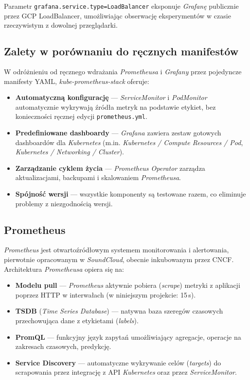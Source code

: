 Parametr \texttt{grafana.service.type=LoadBalancer} eksponuje \textit{Grafanę} publicznie przez GCP LoadBalancer, umożliwiając obserwację eksperymentów w czasie rzeczywistym z dowolnej przeglądarki.

\subsection{Zalety w porównaniu do ręcznych manifestów}

W odróżnieniu od ręcznego wdrażania \textit{Prometheusa} i \textit{Grafany} przez pojedyncze manifesty YAML, \textit{kube-prometheus-stack} oferuje:

\begin{itemize}
  \item \textbf{Automatyczną konfigurację} — \textit{ServiceMonitor} i \textit{PodMonitor} automatycznie wykrywają źródła metryk na podstawie etykiet, bez konieczności ręcznej edycji \texttt{prometheus.yml}.
  \item \textbf{Predefiniowane dashboardy} — \textit{Grafana} zawiera zestaw gotowych dashboardów dla \textit{Kubernetes} (m.in. \textit{Kubernetes / Compute Resources / Pod}, \textit{Kubernetes / Networking / Cluster}).
  \item \textbf{Zarządzanie cyklem życia} — \textit{Prometheus Operator} zarządza aktualizacjami, backupami i skalowaniem \textit{Prometheusa}.
  \item \textbf{Spójność wersji} — wszystkie komponenty są testowane razem, co eliminuje problemy z niezgodnością wersji.
\end{itemize}

\subsection{Prometheus}

\textit{Prometheus} jest otwartoźródłowym systemem monitorowania i alertowania, pierwotnie opracowanym w \textit{SoundCloud}, obecnie inkubowanym przez CNCF. Architektura \textit{Prometheusa} opiera się na:

\begin{itemize}
  \item \textbf{Modelu pull} — \textit{Prometheus} aktywnie pobiera (\textit{scrape}) metryki z aplikacji poprzez HTTP w interwałach (w niniejszym projekcie: 15\,s).
  \item \textbf{TSDB} (\textit{Time Series Database}) — natywna baza szeregów czasowych przechowująca dane z etykietami (\textit{labels}).
  \item \textbf{PromQL} — funkcyjny język zapytań umożliwiający agregacje, operacje na zakresach czasowych, predykcję.
  \item \textbf{Service Discovery} — automatyczne wykrywanie celów (\textit{targets}) do scrapowania przez integrację z API \textit{Kubernetes} oraz przez \textit{ServiceMonitor}.
\end{itemize}

